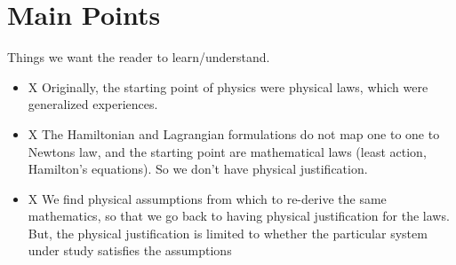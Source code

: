 \documentclass{article}
\begin{document}
\section{Main Points}
Things we want the reader to learn/understand.


\begin{itemize}
\item X Originally, the starting point of physics were physical laws, which were generalized experiences.

\item X The Hamiltonian and Lagrangian formulations do not map one to one to Newtons law, and the starting point are mathematical laws (least action, Hamilton's equations). So we don't have physical justification.

\item X We find physical assumptions from which to re-derive the same mathematics, so that we go back to having physical justification for the laws. But, the physical justification is limited to whether the particular system under study satisfies the assumptions


\end{itemize}
\end{document}
